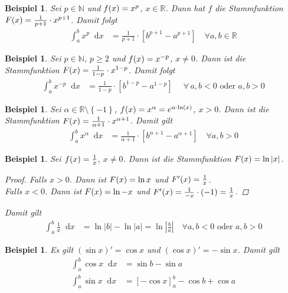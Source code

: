 \documentclass[11pt, twoside, a4paper]{article}
\theoremstyle{plain}
\newtheorem{beispiel}[blockelement]{Beispiel}
\numberwithin{equation}{subsection}
\newcommand{\set}[1]{\left\{#1\right\}}
\newcommand{\pair}[1]{\left(#1\right)}
\newcommand{\of}[1]{\mathopen{}\mathclose{}\bgroup\left(#1\aftergroup\egroup\right)}
\newcommand{\abs}[1]{\left\lvert#1\right\rvert}
\newcommand{\interv}[1]{\left[#1\right]}
\newcommand{\exclude}[0]{\setminus}
\newcommand{\dif}{\mathop{}\!\mathrm{d}}
\newcommand{\fa}{\;\forall\,}
\newcommand{\R}{\mathbb{R}}
\newcommand{\N}{\mathbb{N}}
\begin{document}
    \begin{beispiel}
        Sei $p\in\N$ und $f\of{x} = x^{p}$, $x\in\R$. Dann hat $f$ die Stammfunktion $F\of{x} = \frac{1}{p+1}\cdot x^{p+1}$. Damit folgt
        \begin{align*}
            \int_{a}^{b} x^p \dif x &= \frac{1}{p+1} \cdot \interv{b^{p+1} - a^{p+1}}\quad\forall a, b\in\R
        \end{align*}
    \end{beispiel}
    \begin{beispiel}
        Sei $p\in\N$, $p\geq 2$ und $f\of{x} = x^{-p}$, $x\neq 0$. Dann ist die Stammfunktion $F\of{x} = \frac{1}{1-p}\cdot x^{1-p}$. Damit folgt
        \begin{align*}
            \int_{a}^{b} x^{-p} \dif x &= \frac{1}{1-p}\cdot\interv{b^{1-p} - a^{1-p}}\quad \fa a,b < 0 \text{ oder } a,b > 0
        \end{align*}
    \end{beispiel}
    \begin{beispiel}
        Sei $\alpha\in\R\exclude\set{-1}$, $f\of{x} = x^{\alpha} = e^{\alpha\cdot\ln\of{x}}$, $x > 0$. Dann ist die Stammfunktion $F\of{x} = \frac{1}{\alpha + 1}\cdot x^{\alpha + 1}$. Damit gilt
        \begin{align*}
            \int_{a}^{b} x^{\alpha} \dif x &= \frac{1}{\alpha +1}\cdot\interv{b^{\alpha+1} - a^{\alpha+1}}\quad\forall a,b > 0
        \end{align*}
    \end{beispiel}
    \begin{beispiel}
        Sei $f\of{x} = \frac{1}{x}$, $x\neq 0$. Dann ist die Stammfunktion $F\of{x} = \ln \abs{x}$.
        \begin{proof}
            Falls $x > 0$. Dann ist $F\of{x} = \ln x$ und $F'\of{x} = \frac{1}{x}$.\\
            Falls $x < 0$. Dann ist $F\of{x} = \ln -x$ und $F'\of{x} = \frac{1}{-x}\cdot\pair{-1} = \frac{1}{x}$.
        \end{proof}
        \noindent Damit gilt
        \begin{align*}
            \int_{a}^{b} \frac{1}{x} \dif x &= \ln\abs{b} - \ln\abs{a} = \ln\abs{\frac{b}{a}}\quad\forall a,b < 0 \text{ oder } a,b > 0
        \end{align*}
    \end{beispiel}

    \begin{beispiel}
        Es gilt $\pair{\sin x}' = \cos x$ und $\pair{\cos x}' = -\sin x$. Damit gilt
        \begin{align*}
            \int_{a}^{b} \cos x \dif x &= \sin b - \sin a\\
            \int_{a}^{b} \sin x \dif x &= \interv{-\cos x}_a^b -\cos b + \cos a\\
        \end{align*}
    \end{beispiel}
\end{document}
